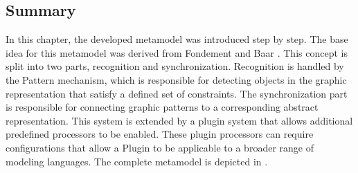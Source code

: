 
\subsection{Summary}
In this chapter, the developed metamodel was introduced step by step. The base idea for this metamodel was derived from Fondement and Baar \cite{fondement_making_2005}. This concept is split into two parts, recognition and synchronization. Recognition is handled by the Pattern mechanism, which is responsible for detecting objects in the graphic representation that satisfy a defined set of constraints. The synchronization part is responsible for connecting graphic patterns to a corresponding abstract representation. This system is extended by a plugin system that allows additional predefined processors to be enabled. These plugin processors can require configurations that allow a Plugin to be applicable to a broader range of modeling languages. The complete metamodel is depicted in .